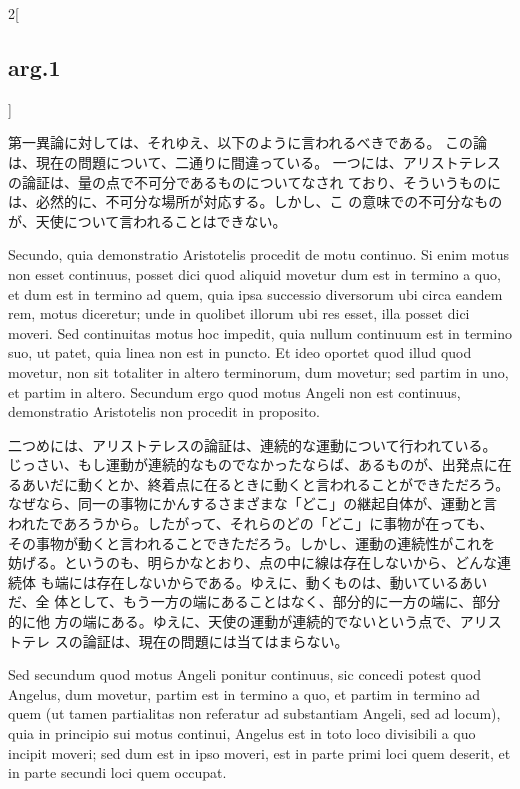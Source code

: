 \documentclass[paper=a4paper,fontsize=10pt,jafontsize=9pt,titlepage]{jlreq}
\begin{document}
\begin{paracol}{2}[\subsection{arg.1}]
\switchcolumn

第一異論に対しては、それゆえ、以下のように言われるべきである。
この論は、現在の問題について、二通りに間違っている。
一つには、アリストテレスの論証は、量の点で不可分であるものについてなされ
 ており、そういうものには、必然的に、不可分な場所が対応する。しかし、こ
 の意味での不可分なものが、天使について言われることはできない。

\switchcolumn*

Secundo, quia demonstratio Aristotelis procedit de motu
continuo. Si enim motus non esset continuus, posset dici quod aliquid
movetur dum est in termino a quo, et dum est in termino ad quem, quia
ipsa successio diversorum ubi circa eandem rem, motus diceretur; unde in
quolibet illorum ubi res esset, illa posset dici moveri. Sed continuitas
motus hoc impedit, quia nullum continuum est in termino suo, ut patet,
quia linea non est in puncto. Et ideo oportet quod illud quod movetur,
non sit totaliter in altero terminorum, dum movetur; sed partim in uno,
et partim in altero. Secundum ergo quod motus Angeli non est continuus,
demonstratio Aristotelis non procedit in proposito.

\switchcolumn

二つめには、アリストテレスの論証は、連続的な運動について行われている。
じっさい、もし運動が連続的なものでなかったならば、あるものが、出発点に在
 るあいだに動くとか、終着点に在るときに動くと言われることができただろう。
 なぜなら、同一の事物にかんするさまざまな「どこ」の継起自体が、運動と言
 われたであろうから。したがって、それらのどの「どこ」に事物が在っても、
 その事物が動くと言われることできただろう。しかし、運動の連続性がこれを
 妨げる。というのも、明らかなとおり、点の中に線は存在しないから、どんな連続体
 も端には存在しないからである。ゆえに、動くものは、動いているあいだ、全
 体として、もう一方の端にあることはなく、部分的に一方の端に、部分的に他
 方の端にある。ゆえに、天使の運動が連続的でないという点で、アリストテレ
 スの論証は、現在の問題には当てはまらない。

\switchcolumn*

Sed secundum quod
motus Angeli ponitur continuus, sic concedi potest quod Angelus, dum
movetur, partim est in termino a quo, et partim in termino ad quem (ut
tamen partialitas non referatur ad substantiam Angeli, sed ad locum),
quia in principio sui motus continui, Angelus est in toto loco
divisibili a quo incipit moveri; sed dum est in ipso moveri, est in
parte primi loci quem deserit, et in parte secundi loci quem occupat.

\switchcolumn


\end{paracol}
\end{document}
